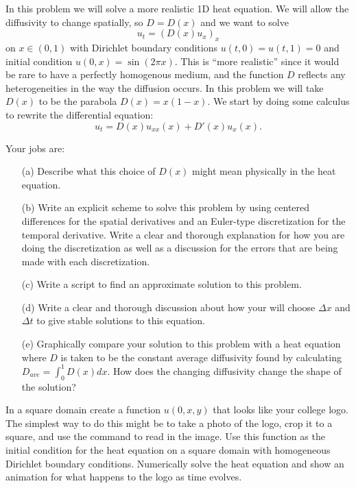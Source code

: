 \begin{problem}
    In this problem we will solve a more realistic 1D heat equation.  We will allow the
    diffusivity to change spatially, so $D = D(x)$ and we want to solve
    \[ u_t = \left( D(x) u_x \right)_x \]
    on $x \in (0,1)$ with Dirichlet boundary conditions $u(t,0) = u(t,1) = 0$ and initial
    condition $u(0,x) = \sin(2 \pi x)$.  This is ``more realistic'' since it would be rare
    to have a perfectly homogenous medium, and the function $D$ reflects any
    heterogeneities in the way the diffusion occurs.  In this problem we will take $D(x)$
    to be the parabola $D(x)= x(1-x)$. We start by doing some calculus to rewrite the
    differential equation:
    \[ u_t = D(x) u_{xx}(x) + D'(x) u_x(x). \]

    Your jobs are:
    \begin{enumerate}
        \item[(a)] Describe what this choice of $D(x)$ might mean physically in the heat
            equation.
        \item[(b)] Write an explicit scheme to solve this problem by using centered differences
            for the spatial derivatives and an Euler-type discretization for the temporal
            derivative.  Write a clear and thorough explanation for how you are doing the
            discretization as well as a discussion for the errors that are being made with
            each discretization.
        \item[(c)] Write a \ProgLang script to find an approximate solution to this problem.
        \item[(d)] Write a clear and thorough discussion about how your will choose $\Delta x$
            and $\Delta t$ to give stable solutions to this equation.
        \item[(e)] Graphically compare your solution to this problem with a heat equation
            where $D$ is taken to be the constant average diffusivity found by calculating
            $D_{ave} = \int_0^1 D(x) dx.$  How does the changing diffusivity change the
            shape of the solution?
    \end{enumerate}

\end{problem}

\begin{problem}
    In a square domain create a function $u(0,x,y)$ that looks like your college logo.
    The simplest way to do this might be to take a photo of the logo, crop it to a square,
    and use the  command to read in the image.  Use this function as the
    initial condition for the heat equation on a square domain with homogeneous Dirichlet
    boundary conditions.  Numerically solve the heat equation and show an animation for
    what happens to the logo as time evolves.
\end{problem}

